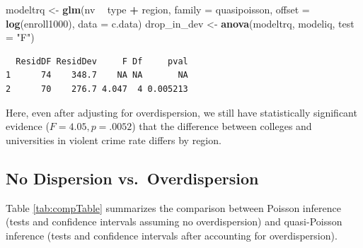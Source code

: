 \documentclass[
]{krantz}
\newenvironment{Shaded}{\begin{snugshade}}{\end{snugshade}}
\newcommand{\DataTypeTok}[1]{\textcolor[rgb]{0.27,0.27,0.27}{#1}}
\newcommand{\KeywordTok}[1]{\textcolor[rgb]{0.27,0.27,0.27}{\textbf{#1}}}
\newcommand{\NormalTok}[1]{#1}
\newcommand{\OperatorTok}[1]{\textcolor[rgb]{0.43,0.43,0.43}{\textbf{#1}}}
\newcommand{\StringTok}[1]{\textcolor[rgb]{0.5,0.5,0.5}{#1}}
\begin{document}
\begin{Shaded}
\begin{Highlighting}[]
\NormalTok{modeltrq <-}\StringTok{ }\KeywordTok{glm}\NormalTok{(nv }\OperatorTok{~}\StringTok{ }\NormalTok{type }\OperatorTok{+}\StringTok{ }\NormalTok{region, }\DataTypeTok{family =}\NormalTok{ quasipoisson,}
               \DataTypeTok{offset =} \KeywordTok{log}\NormalTok{(enroll1000), }\DataTypeTok{data =}\NormalTok{ c.data)}
\NormalTok{drop_in_dev <-}\StringTok{ }\KeywordTok{anova}\NormalTok{(modeltrq, modeliq, }\DataTypeTok{test =} \StringTok{"F"}\NormalTok{)}
\end{Highlighting}
\end{Shaded}

\begin{verbatim}
  ResidDF ResidDev     F Df     pval
1      74    348.7    NA NA       NA
2      70    276.7 4.047  4 0.005213
\end{verbatim}

Here, even after adjusting for overdispersion, we still have statistically significant evidence (\(F=4.05, p=.0052\)) that the difference between colleges and universities in violent crime rate differs by region.

\hypertarget{no-dispersion-vs.-overdispersion}{%
\subsection{No Dispersion vs.~Overdispersion}\label{no-dispersion-vs.-overdispersion}}

Table \ref{tab:compTable} summarizes the comparison between Poisson inference (tests and confidence intervals assuming no overdispersion) and quasi-Poisson inference (tests and confidence intervals after accounting for overdispersion).

\begin{table}

\caption{\label{tab:compTable}Comparison of Poisson and quasi-Poisson inference.}
\centering
{}
\end{table}
\end{document}
